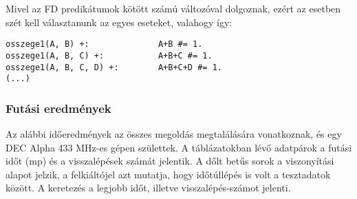 Mivel az FD predikátumok kötött számú változóval dolgoznak, ezért az 
esetben szét kell választanunk az egyes eseteket, valahogy így:

\begin{verbatim}
osszege1(A, B) +:              A+B #= 1.
osszege1(A, B, C) +:           A+B+C #= 1.
osszege1(A, B, C, D) +:        A+B+C+D #= 1.
(...)
\end{verbatim}

\subsubsection{Futási eredmények}

Az alábbi időeredmények az összes megoldás megtalálására vonatkoznak, és egy
DEC Alpha 433 MHz-es gépen születtek. A táblázatokban lévő adatpárok a futási
időt (mp) és a visszalépések számát jelentik. A dőlt betűs sorok a viszonyítási
alapot jelzik, a felkiáltójel azt mutatja, hogy időtúllépés is volt a tesztadatok
között. A keretezés a legjobb időt, illetve visszalépés-számot jelenti.

